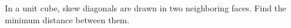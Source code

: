In a unit cube, skew diagonals are drawn in two neighboring faces. Find the minimum distance between them.
